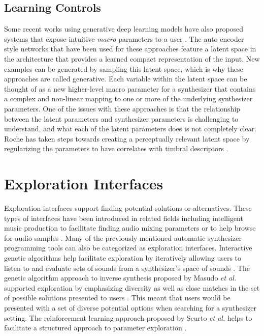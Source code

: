 \subsection{Learning Controls}
Some recent works using generative deep learning models have also proposed systems that expose intuitive \textit{macro} parameters to a user \cite{esling2020flow, roche2021make, le2021improving}. The auto encoder style networks that have been used for these approaches feature a latent space in the architecture that provides a learned compact representation of the input. New examples can be generated by sampling this latent space, which is why these approaches are called generative. Each variable within the latent space can be thought of as a new higher-level macro parameter for a synthesizer that contains a complex and non-linear mapping to one or more of the underlying synthesizer parameters. One of the issues with these approaches is that the relationship between the latent parameters and synthesizer parameters is challenging to understand, and what each of the latent parameters does is not completely clear. Roche has taken steps towards creating a perceptually relevant latent space by regularizing the parameters to have correlates with timbral descriptors \cite{roche2021make}.

\section{Exploration Interfaces}
Exploration interfaces support finding potential solutions or alternatives. These types of interfaces have been introduced in related fields including intelligent music production to facilitate finding audio mixing parameters \cite{cartwright2014mixploration} or to help browse for audio samples \cite{fried2014audioquilt, shier2021manifold, turquois2016exploring}. Many of the previously mentioned automatic synthesizer programming tools can also be categorized as exploration interfaces. Interactive genetic algorithms help facilitate exploration by iteratively allowing users to listen to and evaluate sets of sounds from a synthesizer's space of sounds \cite{johnson1999exploring, dahlstedt2001creating, yee2016use}. The genetic algorithm approach to inverse synthesis proposed by Masudo \textit{et al.} supported exploration by emphasizing diversity as well as close matches in the set of possible solutions presented to users \cite{masudo2021quality}. This meant that users would be presented with a set of diverse potential options when searching for a synthesizer setting. The reinforcement learning approach proposed by Scurto \textit{et al.} helps to facilitate a structured approach to parameter exploration \cite{scurto2021designing}. 

